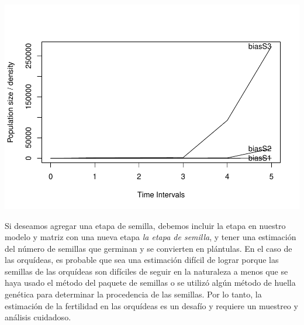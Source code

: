 \documentclass[
]{book}
\theoremstyle{definition}
\theoremstyle{definition}
\theoremstyle{definition}
\theoremstyle{definition}
\theoremstyle{remark}
\begin{document}
\includegraphics{Diagnostico_Poblacional_files/figure-latex/unnamed-chunk-45-1.pdf}

Si deseamos agregar una etapa de semilla, debemos incluir la etapa en nuestro modelo y matriz con una nueva etapa \emph{la etapa de semilla}, y tener una estimación del número de semillas que germinan y se convierten en plántulas. En el caso de las orquídeas, es probable que sea una estimación difícil de lograr porque las semillas de las orquídeas son difíciles de seguir en la naturaleza a menos que se haya usado el método del paquete de semillas \citep{rasmussen1993seed, batty2006situ, shao2024improved} o se utilizó algún método de huella genética para determinar la procedencia de las semillas. Por lo tanto, la estimación de la fertilidad en las orquídeas es un desafío y requiere un muestreo y análisis cuidadoso.
\end{document}
